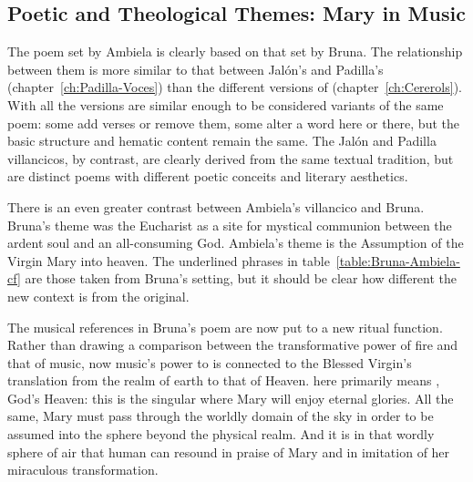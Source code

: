 \subsection{Poetic and Theological Themes: Mary in Music}

The poem set by Ambiela is clearly based on that set by Bruna.
The relationship between them is more similar to that between Jalón's  and Padilla's  (chapter~\ref{ch:Padilla-Voces}) than the different versions of  (chapter~\ref{ch:Cererols}).
With  all the versions are similar enough to be considered variants of the same poem: some add verses or remove them, some alter a word here or there, but the basic structure and hematic content remain the same. 
The Jalón and Padilla villancicos, by contrast, are clearly derived from the same textual tradition, but are distinct poems with different poetic conceits and literary aesthetics.

There is an even greater contrast between Ambiela's villancico and Bruna.
Bruna's theme was the Eucharist as a site for mystical communion between the ardent soul and an all-consuming God.
Ambiela's theme is the Assumption of the Virgin Mary into heaven.
The underlined phrases in table~\ref{table:Bruna-Ambiela-cf} are those taken from Bruna's setting, but it should be clear how different the new context is from the original.

% 	

The musical references in Bruna's poem are now put to a new ritual function.
Rather than drawing a comparison between the transformative power of fire and that of music, now music's power to  is connected to the Blessed Virgin's translation from the realm of earth to that of Heaven.
 here primarily means , God's Heaven: this is the singular  where Mary will enjoy eternal glories.
All the same, Mary must pass through the worldly domain of the sky in order to be assumed into the sphere beyond the physical realm.
And it is in that wordly sphere of air that human  can resound in praise of Mary and in imitation of her miraculous transformation.


